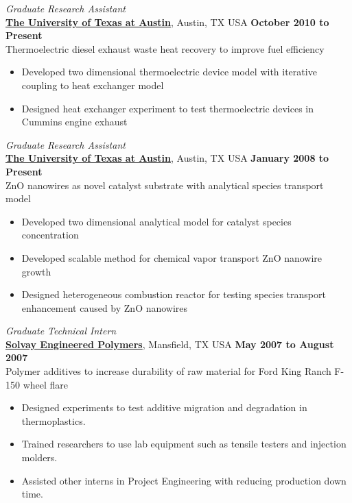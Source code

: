\documentclass[centered]{res}
\begin{document}
\begin{resume}
\textit{Graduate Research Assistant} \\
\href{http://www.utexas.edu/}{\textbf{The University of Texas at
    Austin}}, Austin, TX USA%
\hfill \textbf{October 2010 to Present} \\
Thermoelectric diesel exhaust waste heat recovery to improve fuel
efficiency
\begin{itemize} \itemsep -2pt
\item Developed two dimensional thermoelectric device model with
  iterative coupling to heat exchanger model
\item Designed heat exchanger experiment to test thermoelectric
  devices in Cummins engine exhaust
\end{itemize} 
%
\textit{Graduate Research Assistant} \\
\href{http://www.utexas.edu/}{\textbf{The University of Texas at
    Austin}}, Austin, TX USA%
\hfill \textbf{January 2008 to Present} \\
ZnO nanowires as novel catalyst substrate with analytical species
transport model
\begin{itemize} \itemsep -2pt %
\item Developed two dimensional analytical model for catalyst
  species concentration
\item Developed scalable method for chemical vapor transport ZnO
  nanowire growth
\item Designed heterogeneous combustion reactor for testing species
  transport enhancement caused by ZnO nanowires
\end{itemize} 
%
\textit{Graduate Technical Intern} \\
\href{http://www.lyondellbasell.com/LandingPages/SolvayEngineeredPolymers}{\textbf{Solvay
    Engineered Polymers}}, Mansfield, TX USA 
\hfill \textbf{May 2007 to August 2007} \\
Polymer additives to increase durability of raw material for Ford King
Ranch F-150 wheel flare
\begin{itemize} \itemsep -2pt %
\item Designed experiments to test additive migration
  and degradation in thermoplastics.
\item Trained researchers to use lab equipment such as tensile
  testers and injection molders.
\item Assisted other interns in Project Engineering with
  reducing production down time.
\end{itemize} 
%
\newpage{} 

\end{resume}
\end{document}
